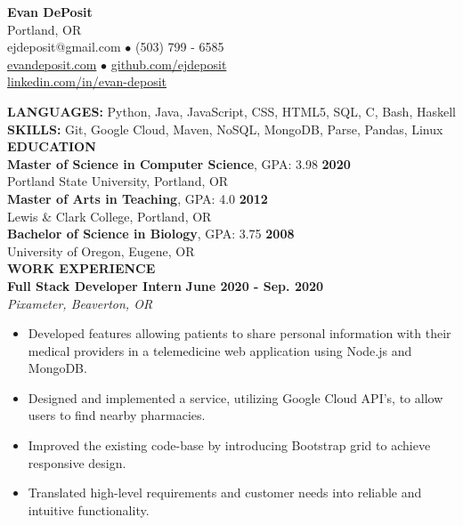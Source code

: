 \documentclass[11pt]{article}
\begin{document}
\thispagestyle{empty}
\begin{center}
\noindent \Large{\textbf{Evan DePosit}}\\
\large{Portland, OR}\\
\large{ejdeposit@gmail.com $\bullet$ (503) 799 - 6585}\\
\href{http://evandeposit.com}{\large{evandeposit.com}} $\bullet$
\href{http://github.com/ejdeposit}{\large{github.com/ejdeposit}}\\
\href{http://www.linkedin.com/in/evan-deposit}{\large{linkedin.com/in/evan-deposit}}
\end{center}
\medskip
\textbf{LANGUAGES:} Python,  Java, JavaScript, CSS, HTML5, SQL,  C, Bash, Haskell\medskip \\
\textbf{SKILLS:} Git, Google Cloud, Maven, NoSQL, MongoDB, Parse, Pandas, Linux\bigskip\\
\noindent
\makebox[0pt][l]{\rule[-.2\baselineskip]{\linewidth}{.3mm}}%
\large{\textbf{EDUCATION}} \smallskip \\
%
\textbf{Master of Science in Computer Science}, GPA: 3.98
\hfill \textbf{2020}\\ 
Portland State University, Portland, OR
\medskip \\
%
\textbf{Master of Arts in Teaching}, GPA: 4.0
\hfill \textbf{2012}\\
Lewis \& Clark College, Portland, OR
\medskip \\
%
\textbf{Bachelor of Science in Biology}, GPA: 3.75
\hfill \textbf{2008}\\
University of Oregon, Eugene, OR
\bigskip\\
\makebox[0pt][l]{\rule[-.2\baselineskip]{\linewidth}{.3mm}}%
\large{\textbf{WORK EXPERIENCE}}\smallskip \\
%
\textbf{Full Stack Developer Intern} \hfill \textbf{June 2020 - Sep. 2020}\\
\textsl{Pixameter, Beaverton, OR} 
\begin{itemize}[leftmargin=*, itemsep=0pt, topsep=5pt]
	\item Developed features allowing patients to share personal information with their medical providers in a telemedicine web application using Node.js and MongoDB.
	\item Designed and implemented a service, utilizing Google Cloud API's, to allow users to find nearby pharmacies.
	\item Improved the existing code-base by introducing Bootstrap grid to achieve responsive design.
	\item Translated high-level requirements and customer needs into reliable and intuitive functionality.
\end{itemize}
\end{document}
